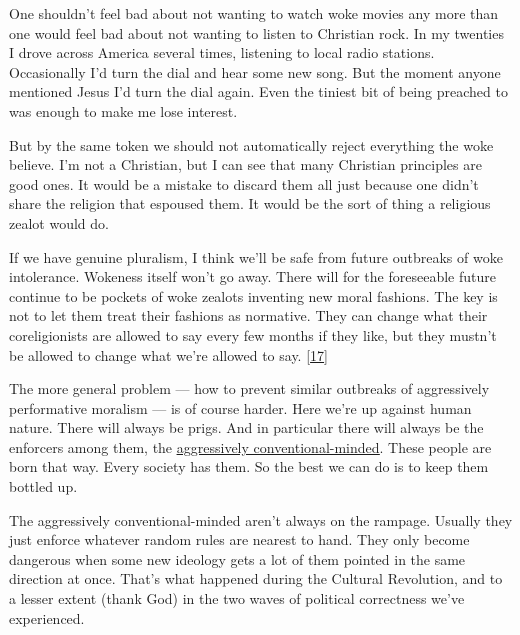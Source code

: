 One shouldn't feel bad about not wanting to watch
                  woke movies any more than one would feel bad about not wanting
                  to listen to Christian rock. In my twenties I drove across
                  America several times, listening to local radio stations.
                  Occasionally I'd turn the dial and hear some new song. But the
                  moment anyone mentioned Jesus I'd turn the dial again. Even
                  the tiniest bit of being preached to was enough to make me
                  lose interest.

But by the same token we should not
                  automatically reject everything the woke believe. I'm not a
                  Christian, but I can see that many Christian principles are
                  good ones. It would be a mistake to discard them all just
                  because one didn't share the religion that espoused them. It
                  would be the sort of thing a religious zealot would do.

If
                  we have genuine pluralism, I think we'll be safe from future
                  outbreaks of woke intolerance. Wokeness itself won't go away.
                  There will for the foreseeable future continue to be pockets
                  of woke zealots inventing new moral fashions. The key is not
                  to let them treat their fashions as normative. They can change
                  what their coreligionists are allowed to say every few months
                  if they like, but they mustn't be allowed to change what we're
                  allowed to say.
                  [\href{\#f17n}{17}]

The more general problem --- how to prevent
                  similar outbreaks of aggressively performative moralism
                  --- is of course harder. Here we're up against human
                  nature. There will always be prigs. And in particular there
                  will always be the enforcers among them, the
                  \href{http://www.paulgraham.com/conformism.html}{\underline{aggressively conventional-minded}}. These people are born that way. Every society has them. So
                  the best we can do is to keep them bottled up.

The
                  aggressively conventional-minded aren't always on the rampage.
                  Usually they just enforce whatever random rules are nearest to
                  hand. They only become dangerous when some new ideology gets a
                  lot of them pointed in the same direction at once. That's what
                  happened during the Cultural Revolution, and to a lesser
                  extent (thank God) in the two waves of political correctness
                  we've experienced.

